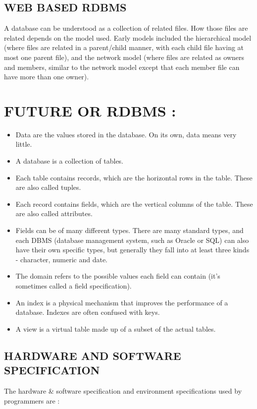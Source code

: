 \documentclass{article}
\begin{document}
\begin{center}
   \section*{\textbf{WEB BASED RDBMS}} 
\end{center}
A database can be understood as a collection of related files. How those files are related depends on the model used. Early models included the hierarchical model (where files are related in a parent/child manner, with each child file having at most one parent file), and the network model (where files are related as owners and members, similar to the network model except that each member file can have more than one owner).
\\
\section*{FUTURE OR RDBMS : }
\begin{itemize}
    \item Data are the values stored in the database. On its own, data means very little.
\item  A database is a collection of tables.
\item Each table contains records, which are the horizontal rows in the table. These are also called tuples.
\item Each record contains fields, which are the vertical columns of the table. These are also called attributes.
\item Fields can be of many different types. There are many standard types, and each DBMS (database management system, such as Oracle or SQL) can also have their own specific types, but generally they fall into at least three kinds - character, numeric and date.
\item The domain refers to the possible values each field can contain (it's sometimes called a field specification).
\item An index is a physical mechanism that improves the performance of a database. Indexes are often confused with keys.
\item A view is a virtual table made up of a subset of the actual tables.
\end{itemize}
\begin{center}
   \section*{\textbf{HARDWARE AND SOFTWARE SPECIFICATION}} 
\end{center}
The hardware & software specification and environment specifications used by programmers are : 
\\
\end{document}
